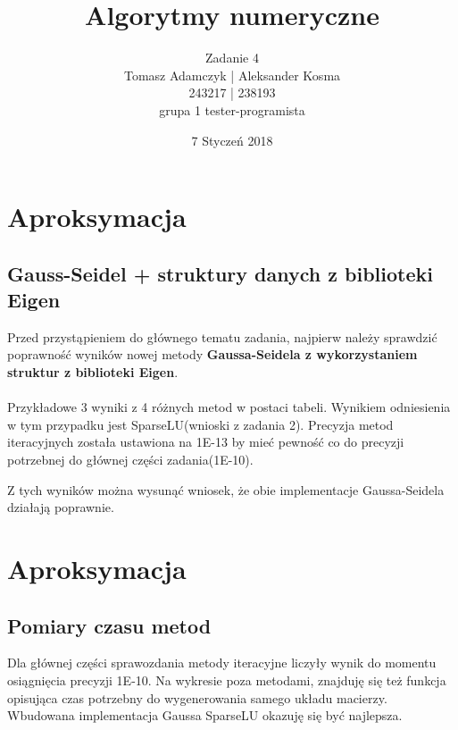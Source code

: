 \documentclass[8pt]{article}
\title{Algorytmy numeryczne}
\author{Zadanie 4 \\ Tomasz Adamczyk | Aleksander Kosma\\243217 | 238193\\grupa 1 tester-programista}
\date{7 Styczeń 2018}
\begin{document}
\maketitle 

\section*{Aproksymacja}

\subsection*{Gauss-Seidel + struktury danych z biblioteki Eigen}
Przed przystąpieniem do głównego tematu zadania, najpierw należy sprawdzić poprawność wyników nowej metody \textbf{Gaussa-Seidela z wykorzystaniem struktur z biblioteki Eigen}.\\
\\
Przykładowe 3 wyniki z 4 różnych metod w postaci tabeli. Wynikiem odniesienia w tym przypadku jest SparseLU(wnioski z zadania 2). Precyzja metod iteracyjnych została ustawiona na 1E-13 by mieć pewność co do precyzji potrzebnej do głównej części zadania(1E-10).
\begin{center}
\end{center}
Z tych wyników można wysunąć wniosek, że obie implementacje Gaussa-Seidela działają poprawnie.

\section*{Aproksymacja}
\subsection*{Pomiary czasu metod}
Dla głównej części sprawozdania metody iteracyjne liczyły wynik do momentu osiągnięcia precyzji 1E-10. Na wykresie poza metodami, znajduję się też funkcja opisująca czas potrzebny do wygenerowania samego układu macierzy. Wbudowana implementacja Gaussa SparseLU okazuję się być najlepsza.
\end{document}
